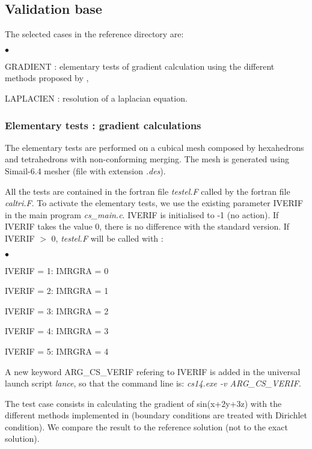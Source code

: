 \subsection{Validation base}

The selected cases in the reference directory are:
\begin{list}{$\bullet$}{}
\item GRADIENT : elementary tests of gradient calculation using the
      different methods proposed by \CS,
\item LAPLACIEN : resolution of a laplacian equation.
\end{list}

\subsubsection{Elementary tests : gradient calculations}
The elementary tests are performed on a cubical mesh composed by
hexahedrons and tetrahedrons with non-conforming merging. The mesh is
generated using Simail-6.4 mesher (file with extension {\it .des}).

All the tests are contained in the fortran file {\it testel.F} called by
the fortran file {\it caltri.F}. To activate the elementary tests,
we use the existing parameter IVERIF in the main program {\it
cs\_main.c}. IVERIF is initialised to -1 (no action). If IVERIF takes
the value 0, there is no difference with the standard version. If
IVERIF $>$ 0, {\it testel.F} will be called with :
\begin{list}{$\bullet$}{}
\item IVERIF = 1: IMRGRA = 0
\item IVERIF = 2: IMRGRA = 1
\item IVERIF = 3: IMRGRA = 2
\item IVERIF = 4: IMRGRA = 3
\item IVERIF = 5: IMRGRA = 4
\end{list}

A new keyword ARG\_CS\_VERIF refering to IVERIF is added in the
universal launch script {\it lance}, so that the command line is:
{\it cs14.exe -v ARG\_CS\_VERIF}.

The test case consists in calculating the gradient of sin(x+2y+3z)
with the different methods implemented in \CS (boundary conditions
are treated with Dirichlet condition). We compare the result to the
reference solution (not to the exact solution).


